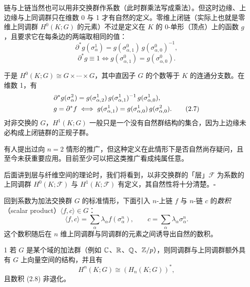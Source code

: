 \begin{remark}{}
链与上链当然也可以用非交换群作系数（此时群乘法写成乘法）。但这时边缘、上边缘与上同调群只在维数 0 与 1 才有自然的定义。零维上闭链（实际上也就是零维上同调群 $H^0(K;G)$ 的元素）不过是定义在 $K$ 的 0-单形（顶点）上的函数 $g$，且要求它在每条边的两端取相同的值：
\begin{equation}
  \partial^*g(\sigma_{\alpha}^{1})=g(\sigma_{\alpha,1}^{0})\,g(\sigma_{\alpha,0}^{0})^{-1},
  \tag{2.6}
\end{equation}
\[
  \partial^*g\equiv 1\iff g(\sigma_{\alpha,1}^{0})=g(\sigma_{\alpha,0}^{0}).
\]
\end{remark}
于是 $H^0(K;G)\cong G\times\cdots\times G$，其中直因子 $G$ 的个数等于 $K$ 的连通分支数。在维数 1，有
\begin{align}
  \partial^*g(\sigma_{\alpha}^{2}) &= g(\sigma_{\alpha,2}^{1})\,g(\sigma_{\alpha,1}^{1})^{-1}\,g(\sigma_{\alpha,0}^{1}),\notag\\
  g=\partial^*f &\iff g(\sigma_{\alpha,1}^{1})=g(\sigma_{\alpha,0}^{1})\,g(\sigma_{\alpha,0}^{2}). \tag{2.7}
\end{align}
对非交换的 $G$，$H^1(K;G)$ 一般只是一个没有自然群结构的集合，因为上边缘未必构成上闭链群的正规子群。

有人提出过向 $n=2$ 情形的推广，但这种定义在此情形下是否自然尚存疑问，且至今未获重要应用。目前至少可以把这类推广看成纯属任意。

后面讲到层与纤维空间的理论时，我们将看到，以非交换群的「层」$\mathscr{F}$ 为系数的上同调群 $H^0(K;\mathscr{F})$ 与 $H^1(K;\mathscr{F})$ 有定义，其自然性将十分清楚。\hfill$\square$

回到系数为加法交换群 $G$ 的标准情形，下面引入 $n$-上链 $f$ 与 $n$-链 $c$ 的\emph{数积}（scalar product）$\langle f,c\rangle\in G$：
\begin{equation}
  \langle f,c\rangle=\sum_{\alpha}\lambda_{\alpha}f(\sigma_{\alpha}^{n}),
  \qquad c=\sum_{\alpha}\lambda_{\alpha}\sigma_{\alpha}^{n}. \tag{2.8}
\end{equation}
这个数积随后在 $n$ 维上同调群与同调群的元素之间诱导出自然的数积。

\begin{example*}{1}
若 $G$ 是某个域的加法群（例如 $\mathbb{C}$、$\mathbb{R}$、$\mathbb{Q}$、$\mathbb{Z}/p$），则同调群与上同调群额外具有 $G$ 上向量空间的结构，并且有
\begin{equation}
  H^n(K;G)\cong (H_n(K;G))^{*}, \tag{2.9}
\end{equation}
且数积 (2.8) 非退化。
\end{example*}

